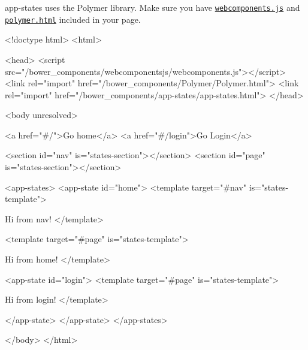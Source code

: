 app-\/states uses the Polymer library. Make sure you have \href{http://webcomponents.org/polyfills/}{\tt webcomponents.\+js} and \href{https://www.polymer-project.org/}{\tt polymer.\+html} included in your page.


\begin{DoxyCode}
<!doctype html>
<html>

<head>
    <script src="/bower\_components/webcomponentsjs/webcomponents.js"></script>
    <link rel="import" href="/bower\_components/Polymer/Polymer.html">
    <link rel="import" href="/bower\_components/app-states/app-states.html">
</head>

<body unresolved>

    <a href="#/">Go home</a>
    <a href="#/login">Go Login</a>

    
    <section id="nav" is="states-section"></section>
    <section id="page" is="states-section"></section>

    
    <app-states>
        <app-state id="home">
            <template target="#nav" is="states-template">
                
                Hi from nav!
            </template>

            <template target="#page" is="states-template">
                
                Hi from home!
            </template>

            <app-state id="login">
                <template target="#page" is="states-template">
                    
                    Hi from login!
                </template>
                
            </app-state>
        </app-state>
    </app-states>

</body>
</html>
\end{DoxyCode}
 